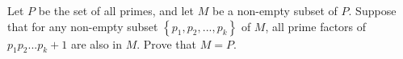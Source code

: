 Let $P$ be the set of all primes, and let $M$ be a non-empty subset of $P$. Suppose that for any non-empty subset $\left\{p_1,p_2,...,p_k\right\}$ of $M$, all prime factors of $p_1p_2...p_k+1$ are also in $M$. Prove that $M=P$.